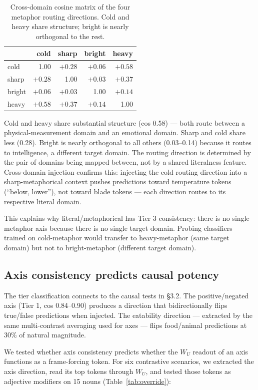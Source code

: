 \documentclass[11pt]{article}
\newcommand{\WU}{W_U}
\begin{document}
\begin{table}[htbp]
\centering
\small
\begin{tabular}{lrrrr}
\toprule
 & cold & sharp & bright & heavy \\
\midrule
cold & 1.00 & $+0.28$ & $+0.06$ & $+0.58$ \\
sharp & $+0.28$ & 1.00 & $+0.03$ & $+0.37$ \\
bright & $+0.06$ & $+0.03$ & 1.00 & $+0.14$ \\
heavy & $+0.58$ & $+0.37$ & $+0.14$ & 1.00 \\
\bottomrule
\end{tabular}
\caption{Cross-domain cosine matrix of the four metaphor routing directions. Cold and heavy share structure; bright is nearly orthogonal to the rest.}
\label{tab:metaphor-cos}
\end{table}

Cold and heavy share substantial structure (cos 0.58) --- both route between
a physical-measurement domain and an emotional domain. Sharp and cold share
less (0.28). Bright is nearly orthogonal to all others (0.03--0.14) because
it routes to intelligence, a different target domain. The routing direction
is determined by the pair of domains being mapped between, not by a
shared literalness feature. Cross-domain injection confirms this: injecting
the cold routing direction into a sharp-metaphorical context pushes
predictions toward temperature tokens (``below, lower''), not toward blade
tokens --- each direction routes to its respective literal domain.

This explains why literal/metaphorical has Tier 3 consistency: there is no
single metaphor axis because there is no single target domain. Probing
classifiers trained on cold-metaphor would transfer to heavy-metaphor (same
target domain) but not to bright-metaphor (different target domain).

\subsection{Axis consistency predicts causal potency}

The tier classification connects to the causal tests in \S3.2. The
positive/negated axis (Tier 1, cos 0.84--0.90) produces a direction that
bidirectionally flips true/false predictions when injected. The eatability
direction --- extracted by the same multi-contrast averaging used for axes ---
flips food/animal predictions at 30\% of natural magnitude.

We tested whether axis consistency predicts whether the $\WU$ readout of an
axis functions as a frame-forcing token. For six contrastive scenarios, we
extracted the axis direction, read its top tokens through $\WU$, and tested
those tokens as adjective modifiers on 15 nouns (Table~\ref{tab:override}):
\end{document}
